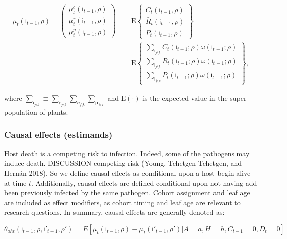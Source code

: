 \documentclass[]{article}
\begin{document}
\begin{align*}
\mu_{t}(\mathsf{i}_{t-1}, \rho) = 
\begin{pmatrix}
  \mu^c_{t}(\mathsf{i}_{t-1}, \rho) \\
  \mu^r_{t}(\mathsf{i}_{t-1}, \rho) \\
  \mu^p_{t}(\mathsf{i}_{t-1}, \rho) 
\end{pmatrix} &= 
\mathrm{E} 
\left\{ 
\begin{array}{l}
  \bar{C}_{t}(\mathsf{i}_{t-1}, \rho) \\
  \bar{R}_{t}(\mathsf{i}_{t-1}, \rho) \\ 
  \bar{P}_{t}(\mathsf{i}_{t-1}, \rho) 
\end{array}
\right\} \\
&= 
\mathrm{E} \left\{
\begin{array}{l}
  \sum_{\mathsf{i}_{j \setminus k}} C_{t}(\mathsf{i}_{t-1}; \rho) \omega(\mathsf{i}_{t-1}; \rho)  \\
  \sum_{\mathsf{i}_{j \setminus k}} R_{t}(\mathsf{i}_{t-1}; \rho) \omega(\mathsf{i}_{t-1}; \rho)  \\ 
  \sum_{\mathsf{i}_{j \setminus k}} P_{t}(\mathsf{i}_{t-1}; \rho) \omega(\mathsf{i}_{t-1}; \rho) 
\end{array}
\right\}
,
\end{align*}

where
\(\sum_{\mathsf{i}_{j \setminus k}} \equiv \sum_{\mathbf{r}_{j \setminus k}} \sum_{\mathbf{c}_{j \setminus k}} \sum_{\mathbf{p}_{j \setminus k}}\)
and \(\mathrm{E}(\cdot)\) is the expected value in the super-population
of plants.

\hypertarget{estimands}{%
\subsubsection{Causal effects (estimands)}\label{estimands}}

Host death is a competing risk to infection. Indeed, some of the
pathogens may induce death. DISCUSSION competing risk (Young, Tchetgen
Tchetgen, and Hernán 2018). So we define causal effects as conditional
upon a host begin alive at time \(t\). Additionally, causal effects are
defined conditional upon not having add been previously infected by the
same pathogen. Cohort assignment and leaf age are included as effect
modifiers, as cohort timing and leaf age are relevant to research
questions. In summary, causal effects are generally denoted as:

\[
\theta_{aht}(\mathsf{i}_{t-1}, \rho, \mathsf{i}'_{t-1}, \rho') = E[\mu_{t}(\mathsf{i}_{t-1}, \rho) - \mu_{t}(\mathsf{i}'_{t-1}, \rho') |  A = a, H = h, C_{t-1} = 0, D_t = 0]
\]
\end{document}
